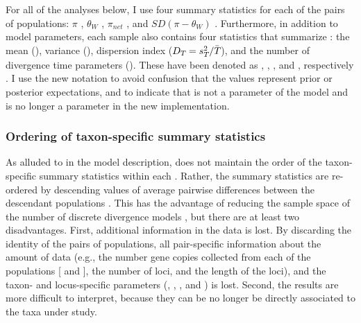 For all of the analyses below, I use four summary statistics for each of
the pairs of populations:
$\pi$ \citep{Tajima1983}, $\theta_W$ \citep{Watterson1975}, $\pi_{net}$
\citep{Takahata1985}, and $SD(\pi-\theta_W)$ \citep{Tajima1989}.
Furthermore, in addition to model parameters, each sample \hpvector{}
also contains four statistics that summarize \divTimeMapVector:
the mean (\divTimeMean), variance (\divTimeVar), dispersion index
($D_{T_{}} = s^{2}_{T_{}}/\bar{T_{}}$), and the number
of divergence time parameters (\divTimeNum).
These have been denoted as \meant{}{}, \vart{}{}, \vmratio{}, and \numt{},
respectively \citep{Hickerson2006,Huang2011,Oaks2012}.
I use the new notation to avoid confusion that the values represent prior or
posterior expectations, and to indicate that \vmratio{} is not a parameter of
the model and \numt{} is no longer a parameter in the new implementation.

\subsubsection{Ordering of taxon-specific summary statistics}
As alluded to in the model description, \msb does not maintain the order of the
taxon-specific summary statistics \alignmentSS{}{} within each \ssVector{}.
Rather, the summary statistics are re-ordered by descending values of average
pairwise differences between the descendant populations
\citep[$\pi_b$;][]{NeiLi1979,Huang2011}.
This has the advantage of reducing the sample space of the number of discrete
divergence models \divTimeIndexVector, but there are at least two disadvantages.
First, additional information in the data is lost.
By discarding the identity of the \npairs{} pairs of populations, all
pair-specific information about the amount of data (e.g., the number gene
copies collected from each of the populations [ and
], the number of loci, and the length of the loci), and the
taxon- and locus-specific parameters (\hkyModel{}{},
\mutationRateScalarConstant{}{}, \ploidyScalar{}{}, and
\locusMutationRateScalar{}) is lost.
Second, the results are more difficult to interpret, because they can be no
longer be directly associated to the taxa under study.

